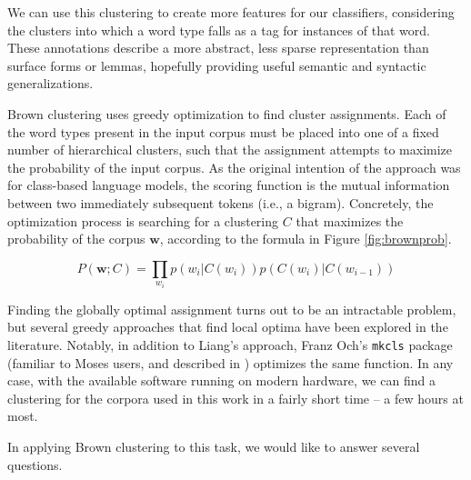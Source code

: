 We can use this clustering to create more features for our classifiers,
considering the clusters into which a word type falls as a tag for instances of
that word. These annotations describe a more abstract, less sparse
representation than surface forms or lemmas, hopefully providing useful
semantic and syntactic generalizations.

Brown clustering uses greedy optimization to find cluster assignments. Each of
the word types present in the input corpus must be placed into one of a fixed
number of hierarchical clusters, such that the assignment attempts to maximize
the probability of the input corpus.  As the original intention of the approach
was for class-based language models, the scoring function is the mutual
information between two immediately subsequent tokens (i.e., a bigram).
Concretely, the optimization process is searching for a clustering $C$ that
maximizes the probability of the corpus $\boldsymbol{w}$, according to the
formula in Figure \ref{fig:brownprob}.

\begin{figure*}

  \begin{equation} \label{eq:brownclassprob}
  P(\boldsymbol{w}; C) = \prod_{w_i} p(w_i | C(w_i)) p(C(w_i) | C(w_{i-1}))
  \end{equation}

  \caption{The Brown clustering expression for the probability of a corpus with
  a specific clustering $C$. It is the product, for each token, of the
  probability of that token given its cluster, and the probability of that
  current cluster given the previous cluster. This is analogous to the
  ``emission" and ``transition" probabilities used in an HMM-based tagger.}
  \label{fig:brownprob}
\end{figure*}

Finding the globally optimal assignment turns out to be an intractable problem,
but several greedy approaches that find local optima have been explored in the
literature.  Notably, in addition to Liang's approach, Franz Och's
\texttt{mkcls} package (familiar to Moses users, and described in
\cite{och1999efficient}) optimizes the same function. In any case, with the
available software running on modern hardware, we can find a clustering for the
corpora used in this work in a fairly short time -- a few hours at most.

In applying Brown clustering to this task, we would like to answer several
questions.

